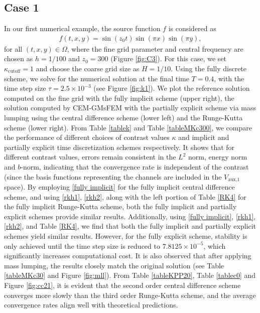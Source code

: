 \documentclass[preprint,12pt]{elsarticle}
\begin{document}
\subsection{Case 1}
In our first numerical example, the source function $f$ is considered as 
\begin{equation}\label{f21}
\begin{aligned}
f(t,x,y)=\sin(z_0t)\sin(\pi x)\sin(\pi y),
\end{aligned}
\end{equation}
for all $(t,x,y)\in \Omega$, where the fine grid parameter and central frequency are chosen as $h=1/100$ and $z_0=300$ (Figure \ref{fig:C3}).
For this case, we set $\kappa_{\text{cutoff}}=1$ and choose the coarse grid size as $H=1/10$. Using the fully discrete scheme, we solve for the numerical solution at the final time $T=0.4$, with the time step size $\tau=2.5\times10^{-3}$ (see Figure \ref{fig:k1}). We plot the reference solution computed on the fine grid with the fully implicit scheme (upper right), the solution computed by CEM-GMsFEM with the partially explicit scheme via mass lumping using the central difference scheme (lower left) and the Runge-Kutta scheme (lower right). 
From Table \ref{tablek} and Table \ref{tableMKc300}, we compare the performance of different choices of contrast values $\kappa$ and implicit and partially explicit time discretization schemes respectively. It shows that for different contrast values, errors remain consistent in the $L^2$ norm, energy norm and $b$-norm, indicating that the convergence rate is independent of the contrast (since the basis functions representing the channels are included in the $V_{\text{aux,1}}$ space). 
By employing \eqref{fully implicit} for the fully implicit central difference scheme, and using \eqref{rkh1}, \eqref{rkh2}, along with the left portion of Table \ref{RK4} for the fully implicit Runge-Kutta scheme, both the fully implicit and partially explicit schemes provide similar results.
Additionally, using \eqref{fully implicit}, \eqref{rkh1}, \eqref{rkh2}, and Table \ref{RK4}, we find that both the fully implicit and partially explicit schemes yield similar results. However, for the fully explicit scheme, stability is only achieved until the time step size is reduced to $7.8125\times 10^{-5}$, which significantly increases computational cost.
It is also observed that after applying mass lumping, the results closely match the original solution (see Table \ref{tableMKc30} and Figure \ref{fig:mll}). From Table \ref{tableKPP20}, Table \ref{tablec0} and Figure \ref{fig:cc21}, it is evident that the second order central difference scheme converges more slowly than the third order Runge-Kutta scheme, and the average convergence rates align well with theoretical predictions.
\end{document}
